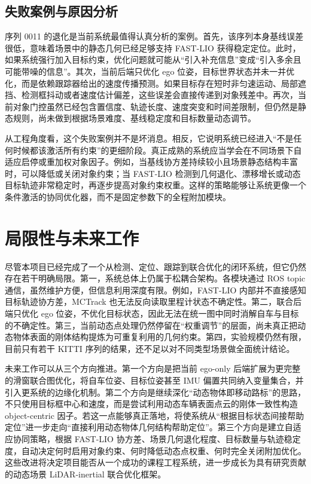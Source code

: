 \documentclass[UTF8,a4paper,12pt]{ctexart}
\begin{document}
\subsection{失败案例与原因分析}
序列 0011 的退化是当前系统最值得认真分析的案例。首先，该序列本身基线误差很低，意味着场景中的静态几何已经足够支持 FAST-LIO 获得稳定定位。此时，如果系统强行加入目标约束，优化问题就可能从“引入补充信息”变成“引入多余且可能带噪的信息”。其次，当前后端只优化 ego 位姿，目标世界状态并未一并优化，而是依赖跟踪器给出的速度传播预测。如果目标存在短时非匀速运动、局部遮挡、检测框抖动或者速度估计偏差，这些误差会直接传递到对象残差中。再次，当前对象门控虽然已经包含置信度、轨迹长度、速度突变和时间差限制，但仍然是静态规则，尚未做到根据场景难度、基线稳定度和目标数量动态调节。

从工程角度看，这个失败案例并不是坏消息。相反，它说明系统已经进入“不是任何时候都该激活所有约束”的更细阶段。真正成熟的系统应当学会在不同场景下自适应启停或重加权对象因子。例如，当基线协方差持续较小且场景静态结构丰富时，可以降低或关闭对象约束；当 FAST-LIO 检测到几何退化、漂移增长或动态目标轨迹非常稳定时，再逐步提高对象约束权重。这样的策略能够让系统更像一个条件激活的协同优化器，而不是固定参数下的全程附加模块。

\section{局限性与未来工作}
尽管本项目已经完成了一个从检测、定位、跟踪到联合优化的闭环系统，但它仍然存在若干明确局限。第一，系统总体上仍属于松耦合架构。各模块通过 ROS topic 通信，虽然维护方便，但信息利用深度有限。例如，FAST-LIO 内部并不直接感知目标轨迹协方差，MCTrack 也无法反向读取里程计状态不确定性。第二，联合后端只优化 ego 位姿，不优化目标状态，因此无法在统一图中同时消解自车与目标的不确定性。第三，当前动态点处理仍然停留在“权重调节”的层面，尚未真正把动态物体表面的刚体结构提炼为可重复利用的几何约束。第四，实验规模仍然有限，目前只有若干 KITTI 序列的结果，还不足以对不同类型场景做全面统计结论。

未来工作可以从三个方向推进。第一个方向是把当前 ego-only 后端扩展为更完整的滑窗联合图优化，将自车位姿、目标位姿甚至 IMU 偏置共同纳入变量集合，并引入更系统的边缘化机制。第二个方向是继续深化“动态物体即移动路标”的思路，不只使用目标框中心和速度，而是尝试利用动态车辆表面点云的刚体一致性构造 object-centric 因子。若这一点能够真正落地，将使系统从“根据目标状态间接帮助定位”进一步走向“直接利用动态物体几何结构帮助定位”。第三个方向是建立自适应协同策略，根据 FAST-LIO 协方差、场景几何退化程度、目标数量与轨迹稳定度，自动决定何时启用对象约束、何时降低动态点权重、何时完全关闭附加优化。这些改进将决定项目能否从一个成功的课程工程系统，进一步成长为具有研究贡献的动态场景 LiDAR-inertial 联合优化框架。
\end{document}
